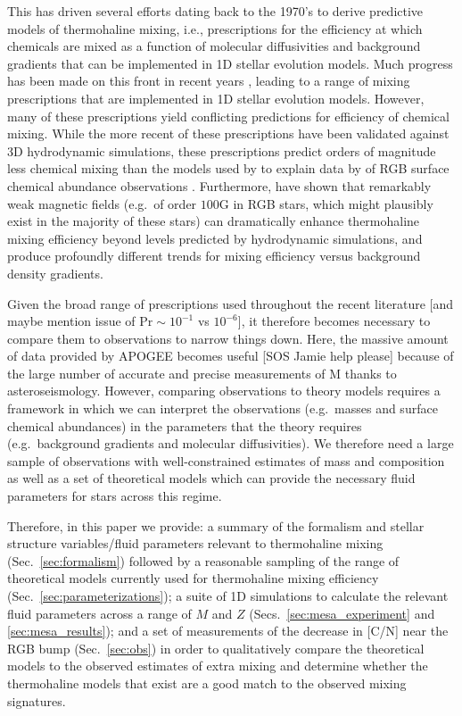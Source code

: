 This has driven several efforts dating back to the 1970's to derive predictive models of thermohaline mixing, i.e., prescriptions for the efficiency at which chemicals are mixed as a function of molecular diffusivities and background gradients that can be implemented in 1D stellar evolution models. 
Much progress has been made on this front in recent years \citep[see review by][and Sec.~\ref{sec:parameterizations} of this paper]{garaud_DDC_review_2018}, leading to a range of mixing prescriptions that are implemented in 1D stellar evolution models. 
However, many of these prescriptions yield conflicting predictions for efficiency of chemical mixing. 
While the more recent of these prescriptions \citep[e.g.~][]{traxler_etal_2011,brown_etal_2013} have been validated against 3D hydrodynamic simulations, these prescriptions predict orders of magnitude less chemical mixing than the models used by \citet{charbonnel_thermohaline_2007} to explain data by \citet{Gratton2000} of RGB surface chemical abundance observations \citep[see Sec.~3.1 of][]{traxler_etal_2011}. 
Furthermore, \citet{harrington} have shown that remarkably weak magnetic fields (e.g.~of order $100$G in RGB stars, which might plausibly exist in the majority of these stars) can dramatically enhance thermohaline mixing efficiency beyond levels predicted by hydrodynamic simulations, and produce profoundly different trends for mixing efficiency versus background density gradients. 

Given the broad range of prescriptions used throughout the recent literature [and maybe mention issue of $\mathrm{Pr} \sim 10^{-1}$ vs $10^{-6}$], it therefore becomes necessary to compare them to observations to narrow things down. 
Here, the massive amount of data provided by APOGEE becomes useful [SOS Jamie help please] because of the large number of accurate and precise measurements of M thanks to asteroseismology. 
However, comparing observations to theory models requires a framework in which we can interpret the observations (e.g.~masses and surface chemical abundances) in the parameters that the theory requires (e.g.~background gradients and molecular diffusivities). 
We therefore need a large sample of observations with well-constrained estimates of mass and composition as well as a set of theoretical models which can provide the necessary fluid parameters for stars across this regime. 

Therefore, in this paper we provide: a summary of the formalism and stellar structure variables/fluid parameters relevant to thermohaline mixing (Sec.~\ref{sec:formalism}) followed by a reasonable sampling of the range of theoretical models currently used for thermohaline mixing efficiency (Sec.~\ref{sec:parameterizations}); a suite of 1D simulations to calculate the relevant fluid parameters across a range of $M$ and $Z$ (Secs.~\ref{sec:mesa_experiment} and \ref{sec:mesa_results}); and a set of measurements of the decrease in [C/N] near the RGB bump (Sec.~\ref{sec:obs}) in order to qualitatively compare the theoretical models to the observed estimates of extra mixing and determine whether the thermohaline models that exist are a good match to the observed mixing signatures.